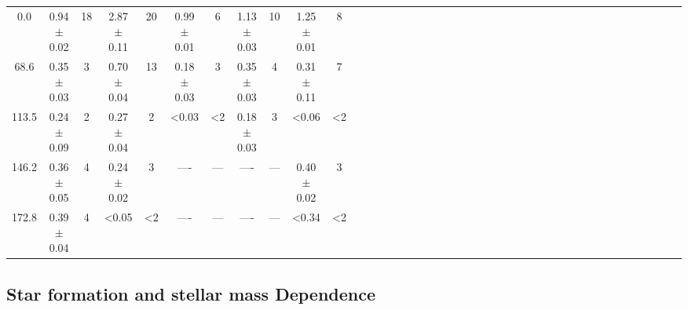 \documentclass[longauth]{aa}
\begin{document}
\begin{table*}
\begin{tabular}{ccccccccccccccccccccccccccccccccccccccccc}
  \hline\hline
  0.0   & 0.94 $\pm$ 0.02 & 18 & 2.87 $\pm$ 0.11 & 20  & 0.99 $\pm$ 0.01 &  6  & 1.13 $\pm$ 0.03 & 10  & 1.25 $\pm$ 0.01 &  8   \\
  68.6  & 0.35 $\pm$ 0.03 & 3  & 0.70 $\pm$ 0.04 & 13  & 0.18 $\pm$ 0.03 &  3  & 0.35 $\pm$ 0.03 &  4  & 0.31 $\pm$ 0.11 &  7   \\
  113.5 & 0.24 $\pm$ 0.09 & 2  & 0.27 $\pm$ 0.04 & 2   &       <0.03     &  <2 & 0.18 $\pm$ 0.03 &  3  &       <0.06     & <2  \\
  146.2 & 0.36 $\pm$ 0.05 & 4  & 0.24 $\pm$ 0.02 & 3   &       ----      & --- &       ----      & --- & 0.40 $\pm$ 0.02 &  3   \\
  172.8 & 0.39 $\pm$ 0.04 & 4  &      <0.05      & <2  &       ----      & --- &       ----      & --- &       <0.34     & <2  \\
\hline\hline 
\end{tabular}
\end{table*}



\subsection{Star formation and stellar mass Dependence}\label{sec:EW-SFR}
\end{document}
